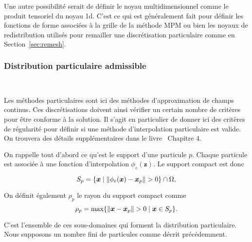 Une autre possibilité serait de définir le noyau multidimensionnel comme le produit tensoriel du noyau 1d. C'est ce qui est généralement fait pour définir les fonctions de forme associées à la grille de la méthode MPM ou bien les noyaux de redistribution utilisés pour remailler une discrétisation particulaire comme en Section~\ref{sec:remesh}.

\subsubsection{Distribution particulaire admissible}~\label{sec:part_admissible}

Les méthodes particulaires sont ici des méthodes d'approximation de champs continus. Ces discrétisations doivent ainsi vérifier un certain nombre de critères pour être conforme à la solution. Il s'agit en particulier de donner ici des critères de régularité pour définir si une méthode d'interpolation particulaire est valide. On trouvera des détails supplémentaires dans le livre~\cite{s_li_meshfree_2004} Chapitre 4.

On rappelle tout d'abord ce qu'est le support d'une particule $p$. Chaque particule est associée à une fonction d'interpolation $\phi_\varepsilon(\bm{z})$. Le support compact est donc

\begin{equation*}
    S_p = \{\bm{x} \mid \| \phi_\varepsilon (\bm{x}) - \bm{x}_p \| > 0\} \cap \Omega,
\end{equation*}

On définit également $\rho_p$ le rayon du support compact comme
\begin{equation*}
    \rho_p =  \max \{\| \bm{x} - \bm{x}_p \| > 0 \mid \bm{x} \in S_p\}.
\end{equation*}

C'est l'ensemble de ces sous-domaines qui forment la distribution particulaire. Nous supposons un nombre fini de particules comme décrit précédemment.%

